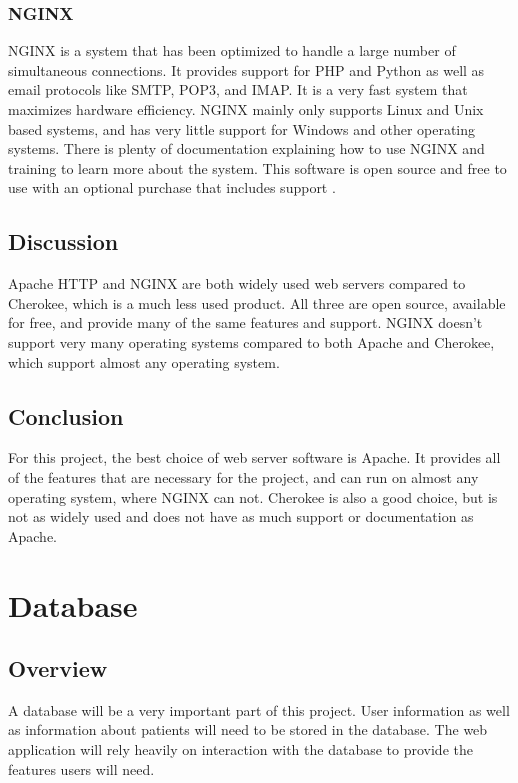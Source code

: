 \documentclass[onecolumn, draftclsnofoot,10pt, compsoc]{IEEEtran}
\begin{document}
\subsubsection{NGINX}
NGINX is a system that has been optimized to handle a large number of simultaneous connections. It provides support for PHP and Python as well as email protocols like SMTP, POP3, and IMAP. It is a very fast system that maximizes hardware efficiency. NGINX mainly only supports Linux and Unix based systems, and has very little support for Windows and other operating systems. There is plenty of documentation explaining how to use NGINX and training to learn more about the system. This software is open source and free to use with an optional purchase that includes support \cite{nginx}.

\subsection{Discussion}
Apache HTTP and NGINX are both widely used web servers compared to Cherokee, which is a much less used product. All three are open source, available for free, and provide many of the same features and support. NGINX doesn't support very many operating systems compared to both Apache and Cherokee, which support almost any operating system.

\subsection{Conclusion}
For this project, the best choice of web server software is Apache. It provides all of the features that are necessary for the project, and can run on almost any operating system, where NGINX can not. Cherokee is also a good choice, but is not as widely used and does not have as much support or documentation as Apache.

\section{Database}

\subsection{Overview}
A database will be a very important part of this project. User information as well as information about patients will need to be stored in the database. The web application will rely heavily on interaction with the database to provide the features users will need.
\end{document}
